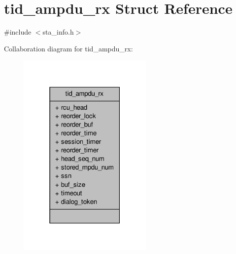 \hypertarget{structtid__ampdu__rx}{\section{tid\-\_\-ampdu\-\_\-rx Struct Reference}
\label{structtid__ampdu__rx}
}


{\ttfamily \#include $<$sta\-\_\-info.\-h$>$}



Collaboration diagram for tid\-\_\-ampdu\-\_\-rx\-:
\nopagebreak
\begin{figure}[H]
\begin{center}
\leavevmode
\includegraphics[width=186pt]{structtid__ampdu__rx__coll__graph}
\end{center}
\end{figure}
